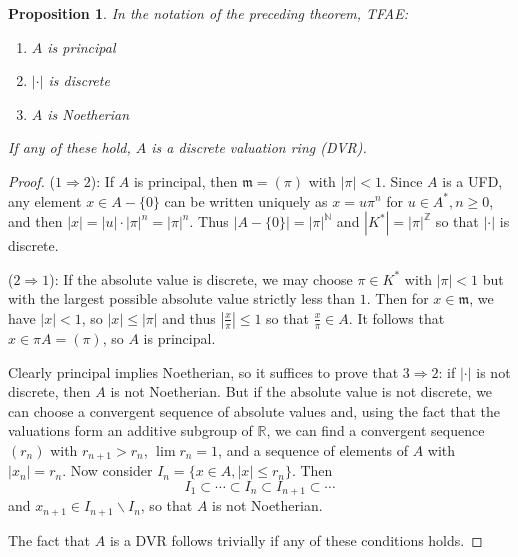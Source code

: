 \documentclass[12pt]{article}
\newcommand{\Abs}[1]{\left\lvert #1\right\rvert}
\newcommand{\BR}{\mathbb{R}}
\newcommand{\BZ}{\mathbb{Z}}
\newcommand{\BN}{\mathbb{N}}
\newcommand{\smm}{\mathfrak{m}}
\newcommand{\U}[1]{{#1}^*}
\newtheorem{prop}[thm]{Proposition}
\begin{document}
\begin{prop} In the notation of the preceding theorem, TFAE:
\begin{enumerate}
\item $A$ is principal
\item $\Abs\cdot$ is discrete
\item $A$ is Noetherian
\end{enumerate}
If any of these hold, $A$ is a discrete valuation ring (DVR).
\end{prop}
\begin{proof} ($1 \Rightarrow 2$): If $A$ is principal, then $\smm=(\pi)$ with $\Abs{\pi} < 1$. Since $A$ is a UFD, any element $x\in A-\{0\}$ can be written uniquely as $x=u\pi^n$ for $u\in\U{A}, n\geq 0$, and then $\Abs x = \Abs u \cdot \Abs{\pi}^n = \Abs{\pi}^n$. Thus $\Abs{A-\{0\}} = \Abs{\pi}^{\BN}$ and $\Abs{\U{K}} = \Abs{\pi}^{\BZ}$ so that $\Abs \cdot$ is discrete.

($2 \Rightarrow 1$): If the absolute value is discrete, we may choose $\pi\in \U{K}$ with $\Abs{\pi}<1$ but with the largest possible absolute value strictly less than $1$. Then for $x\in\smm$, we have $\Abs x < 1$, so $\Abs x\leq \Abs{\pi}$ and thus $\displaystyle \Abs{\frac{x}{\pi}}\leq 1$ so that $\displaystyle \frac{x}{\pi}\in A$. It follows that $x\in \pi A = (\pi)$, so $A$ is principal.

Clearly principal implies Noetherian, so it suffices to prove that $3\Rightarrow 2$: if $\Abs\cdot$ is not discrete, then $A$ is not Noetherian. But if the absolute value is not discrete, we can choose a convergent sequence of absolute values and, using the fact that the valuations form an additive subgroup of $\BR$, we can find a convergent sequence $(r_n)$ with $r_{n+1}>r_n$, $\lim r_n=1$, and a sequence of elements of $A$ with $\Abs{x_n} = r_n$. Now consider $I_n=\{x\in A, \Abs x\leq r_n\}$. Then
\[I_1\subset\cdots\subset I_n\subset I_{n+1}\subset\cdots\]
and $x_{n+1}\in I_{n+1}\backslash I_n$, so that $A$ is not Noetherian.

The fact that $A$ is a DVR follows trivially if any of these conditions holds.
\end{proof}

\end{document}
